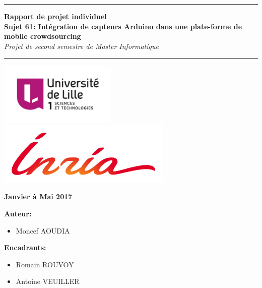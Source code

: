 \pagestyle{empty}



\begin{center}
  \hrule
  \vspace{1cm}
  \textbf{
  {\LARGE  
    Rapport de projet individuel\\
    \vspace{0.3cm}
    Sujet 61: Intégration de capteurs Arduino dans une plate-forme de mobile crowdsourcing
  }}\\
  \vspace{0.8cm}
  {\large\textit{\textcolor{mygray}{Projet de second semestre de Master Informatique}}}\\
  \vspace{0.8cm}
  \hrule

  \vspace{3.5cm}
  \href{http://www.univ-lille1.fr/}{
  \includegraphics[height=3cm]{image/logoLILLE1.jpg}
  }
  \hfill
   \href{https://www.inria.fr/fr/}{
  \includegraphics[height=3cm]{image/InriaLogo.png}
  }
  \vspace{3cm}

  \vspace{1cm}
  {\large\textbf{\textcolor{univmodif}{Janvier à Mai 2017}}}
  \vspace{2cm}
\end{center}

\begin{multicols}{2}  

    \textbf{\textcolor{univmodif}{Auteur:}}\\
    \begin{itemize}
      \item Moncef AOUDIA
    \end{itemize}
    
    \textbf{\textcolor{univmodif}{Encadrants:}}
    \begin{itemize}
      \item Romain ROUVOY
      \item Antoine VEUILLER
    \end{itemize}

\end{multicols}